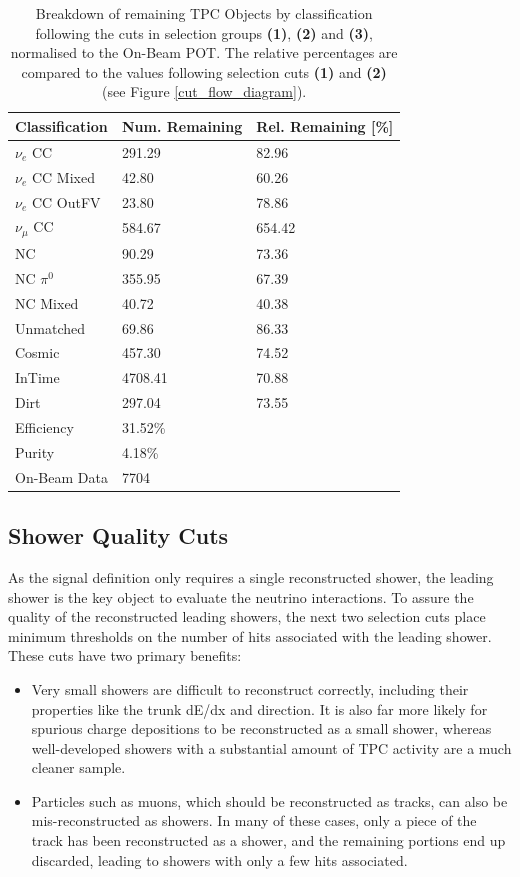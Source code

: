 \begin{table}[htbp]
\center
\begin{tabular}{l | l l }
Classification & Num. Remaining & Rel. Remaining [\%] \\
\hline
$\nu_e$ CC & 291.29 & 82.96\\
$\nu_e$ CC Mixed & 42.80 & 60.26\\
$\nu_e$ CC OutFV & 23.80 & 78.86\\
$\nu_{\mu}$ CC & 584.67 & 654.42\\
NC & 90.29 & 73.36\\
NC $\pi^0$ & 355.95 & 67.39\\
NC Mixed & 40.72 & 40.38\\
Unmatched & 69.86 & 86.33\\
Cosmic & 457.30 & 74.52\\
InTime & 4708.41 & 70.88\\
Dirt & 297.04 & 73.55\\
\hline
\hline
Efficiency & 31.52\%\\
Purity & 4.18\%\\
\hline
On-Beam Data & 7704\\
\hline
\end{tabular}
\caption{Breakdown of remaining TPC Objects by classification following the cuts in selection groups \textbf{(1)}, \textbf{(2)} and \textbf{(3)}, normalised to the On-Beam POT. The relative percentages are compared to the values following selection cuts \textbf{(1)} and \textbf{(2)} (see Figure \ref{cut_flow_diagram}).}\label{selection_summary_table_track_to_vtx}
\end{table}

\FloatBarrier
\subsection{Shower Quality Cuts}

As the signal definition only requires a single reconstructed shower, the leading shower is the key object to evaluate the neutrino interactions. To assure the quality of the reconstructed leading showers, the next two selection cuts place minimum thresholds on the number of hits associated with the leading shower. These cuts have two primary benefits:

\begin{itemize}
\item Very small showers are difficult to reconstruct correctly, including their properties like the trunk dE/dx and direction. It is also far more likely for spurious charge depositions to be reconstructed as a small shower, whereas well-developed showers with a substantial amount of TPC activity are a much cleaner sample. 
\item Particles such as muons, which should be reconstructed as tracks, can also be mis-reconstructed as showers. In many of these cases, only a piece of the track has been reconstructed as a shower, and the remaining portions end up discarded, leading to showers with only a few hits associated.  
\end{itemize}

